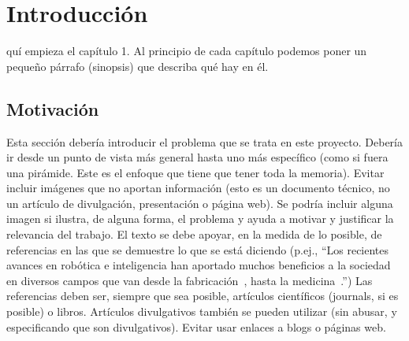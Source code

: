 \documentclass[a4paper,11pt,reqno,twoside]{memoir}
\begin{document}


\frontmatter
{}


%
%

\clearemptydoublepage
%

\clearemptydoublepage
%

\clearemptydoublepage
%

\clearemptydoublepage
%

\clearemptydoublepage
%

\clearemptydoublepage
%

\dominitoc
{\sffamily\tableofcontents*}
\clearemptydoublepage
%
{\sffamily\listoffigures}\mtcaddchapter
\clearemptydoublepage
%
{\sffamily\listoftables}\mtcaddchapter
\clearpage


%
%
\mainmatter

\chapter{Introducción}
\label{cap:introduccion}
\minitoc
\vspace{1cm}
quí empieza el capítulo 1. Al principio de cada capítulo podemos poner un pequeño párrafo (sinopsis) que describa qué hay en él.
\newpage

\section{Motivación}
\label{sec:motivacion}

Esta sección debería introducir el problema que se trata en este proyecto. Debería ir desde un punto de vista más general hasta uno más específico (como si fuera una pirámide. Este es el enfoque que tiene que tener toda la memoria). Evitar incluir imágenes que no aportan información (esto es un documento técnico, no un artículo de divulgación, presentación o página web). Se podría incluir alguna imagen si ilustra, de alguna forma, el problema y ayuda a motivar y justificar la relevancia del trabajo. El texto se debe apoyar, en la medida de lo posible, de referencias en las que se demuestre lo que se está diciendo (p.ej., ``Los recientes avances en robótica e inteligencia han aportado muchos beneficios a la sociedad en diversos campos que van desde la fabricación~\cite{ajoudani2018progress}, hasta la medicina~\cite{malik2019overview}.'') Las referencias deben ser, siempre que sea posible, artículos científicos (journals, si es posible) o libros. Artículos divulgativos también se pueden utilizar (sin abusar, y especificando que son divulgativos). Evitar usar enlaces a blogs o páginas web.
\end{document}
